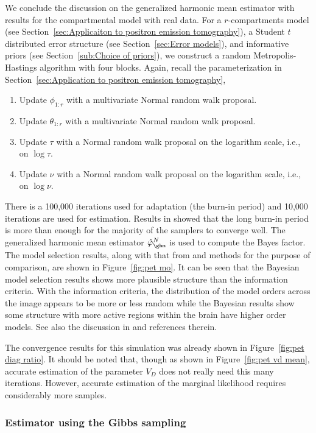 We conclude the discussion on the generalized harmonic mean estimator with
results for the \pet compartmental model with real data. For a
$r$-compartments \pet model (see Section~\ref{sec:Applicaiton to positron
  emission tomography}), a Student $t$ distributed error structure (see
Section~\ref{sec:Error models}), and informative priors (see
Section~\ref{sub:Choice of priors}), we construct a random Metropolis-Hastings
algorithm with four blocks. Again, recall the parameterization in
Section~\ref{sec:Application to positron emission tomography},
\begin{enumerate}
  \item Update $\phi_{1:r}$ with a multivariate Normal random walk proposal.
  \item Update $\theta_{1:r}$ with a multivariate Normal random walk proposal.
  \item Update $\tau$ with a Normal random walk proposal on the logarithm
    scale, i.e., on $\log\tau$.
  \item Update $\nu$ with a Normal random walk proposal on the logarithm
    scale, i.e., on $\log\nu$.
\end{enumerate}
There is a 100,000 iterations used for adaptation (the burn-in period) and
10,000 iterations are used for estimation. Results in \cite{Zhou2013} showed
that the long burn-in period is more than enough for the majority of the
samplers to converge well. The generalized harmonic mean estimator
$\hat\varphi_{\ghm}^N$ is used to compute the Bayes factor. The model
selection results, along with that from \aic and \bic methods for the purpose
of comparison, are shown in Figure~\ref{fig:pet mo}. It can be seen that the
Bayesian model selection results shows more plausible structure than the
information criteria. With the information criteria, the distribution of the
model orders across the image appears to be more or less random while the
Bayesian results show some structure with more active regions within the brain
have higher order models. See also the discussion in \cite{Zhou2013} and
references therein.



The convergence results for this simulation was already shown in
Figure~\ref{fig:pet diag ratio}. It should be noted that, though as shown in
Figure~\ref{fig:pet vd mean}, accurate estimation of the parameter $V_D$ does
not really need this many iterations. However, accurate estimation of the
marginal likelihood requires considerably more samples.

\subsubsection{Estimator using the Gibbs sampling}
\label{ssub:Estimator using the Gibbs sampling}

